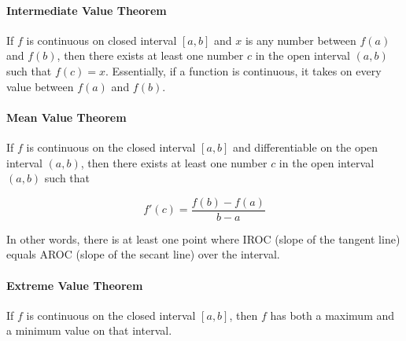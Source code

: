 \documentclass[letterpaper, 12pt]{article}
\begin{document}
\paragraph{Intermediate Value Theorem} If $f$ is continuous on closed interval $[a, b]$ and $x$ is any number between $f(a)$ and $f(b)$, then there exists at least one number $c$ in the open interval $(a, b)$ such that $f(c) = x$. Essentially, if a function is continuous, it takes on every value between $f(a)$ and $f(b)$.

\paragraph{Mean Value Theorem} If $f$ is continuous on the closed interval $[a, b]$ and differentiable on the open interval $(a, b)$, then there exists at least one number $c$ in the open interval $(a, b)$ such that

\[f'(c) = \frac{f(b) - f(a)}{b - a}\]

In other words, there is at least one point where IROC (slope of the tangent line) equals AROC (slope of the secant line) over the interval.

\paragraph{Extreme Value Theorem} If $f$ is continuous on the closed interval $[a, b]$, then $f$ has both a maximum and a minimum value on that interval.
\end{document}
